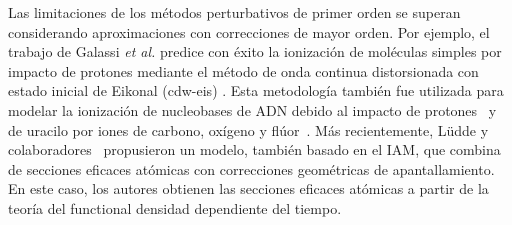 Las limitaciones de los métodos perturbativos de primer orden se superan 
considerando aproximaciones con correcciones de mayor orden. 
Por ejemplo, el trabajo de Galassi \textit{et al.} \cite{Galassi:00} 
predice con éxito la ionización de moléculas simples por impacto de 
protones mediante el método de onda continua distorsionada con estado 
inicial de Eikonal (\acs{cdw-eis}) \cite{Fainstein:88,Miraglia:08,
Miraglia:09}. Esta metodología también fue utilizada para modelar 
la ionización de nucleobases de ADN debido al impacto de 
protones~\cite{Galassi:12} y de uracilo por iones de carbono, oxígeno y 
flúor~\cite{champion2012,agnihotri2012,agnihotri2013}.
Más recientemente, L\"udde y colaboradores~\cite{Ludde:16,Ludde:18,
Ludde:19,Ludde:20} propusieron un modelo, también basado en el IAM, que 
combina de secciones eficaces atómicas con correcciones geométricas de 
apantallamiento. En este caso, los autores obtienen las secciones 
eficaces atómicas a partir de la teoría del functional densidad 
dependiente del tiempo. 

